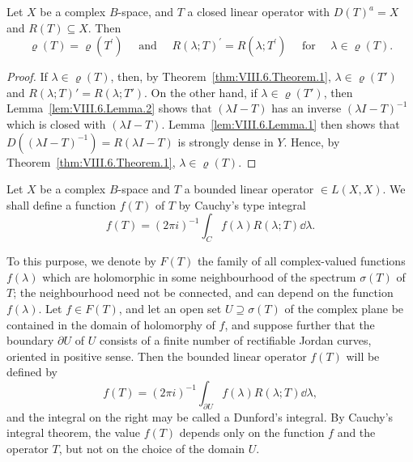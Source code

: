 \begin{theorem}\label{thm:VIII.6.Theorem.2} Let $X$ be a complex $B$-space, and $T$ a closed linear operator with $D(T)^a = X$ and $R(T) \subseteq X$. Then 
\begin{equation}\label{eq:VIII.6.2}
\varrho (T) = \varrho (T ^{\prime}) \quad \text{ and } \quad R (\lambda ; T) ^{\prime} = R (\lambda ; T ^{\prime}) \quad \text{ for } \quad \lambda \in \varrho (T).
\end{equation}
\end{theorem}

\begin{proof}
 If $\lambda \in \varrho(T)$, then, by Theorem~\ref{thm:VIII.6.Theorem.1}, $\lambda \in \varrho(T')$ and $R(\lambda; T)' = R(\lambda; T')$. On the other hand, if $\lambda \in \varrho(T')$, then Lemma~\ref{lem:VIII.6.Lemma.2} shows that $(\lambda I - T)$ has an inverse $(\lambda I - T)^{-1}$ which is closed with $(\lambda I - T)$. Lemma~\ref{lem:VIII.6.Lemma.1} then shows that $D((\lambda I - T)^{-1}) = R(\lambda I - T)$ is strongly dense in $Y$. Hence, by Theorem~\ref{thm:VIII.6.Theorem.1}, $\lambda \in \varrho(T)$. 
\end{proof}


\label{sec:VIII.7}

Let $X$ be a complex $B$-space and $T$ a bounded linear operator $\in L(X, X)$. We shall define a function $f(T)$ of $T$ by Cauchy's type integral 
\[
f (T) = (2 \pi i) ^{-1} \int_{C} f (\lambda) R (\lambda ; T) \dd \lambda .
\]

To this purpose, we denote by $F(T)$ the family of all complex-valued functions $f(\lambda)$ which are holomorphic in some neighbourhood of the spectrum $\sigma(T)$ of $T$; the neighbourhood need not be connected, and can depend on the function $f(\lambda)$. Let $f \in F(T)$, and let an open set $U \supseteq \sigma(T)$ of the complex plane be contained in the domain of holomorphy of $f$, and suppose further that the boundary $\partial U$ of $U$ consists of a finite number of rectifiable Jordan curves, oriented in positive sense. Then the bounded linear operator $f(T)$ will be defined by 
\begin{equation}\label{eq:VIII.7.1}
f (T) = (2 \pi i) ^{-1} \int_{\partial U} f (\lambda) R (\lambda ; T) \dd \lambda ,
\end{equation}
and the integral on the right may be called a Dunford's integral. By Cauchy's integral theorem, the value $f(T)$ depends only on the function $f$ and the operator $T$, but not on the choice of the domain $U$. 

